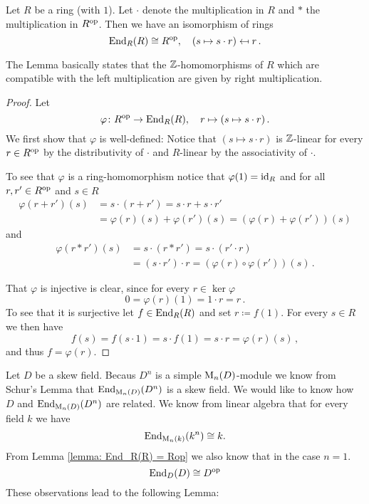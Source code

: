 \begin{lemma}\label{lemma: End_R(R) = Rop}
  Let $R$ be a ring (with $1$).
  Let $\cdot$ denote the multiplication in $R$ and $*$ the multiplication in $R^{\mathrm{op}}$.
  Then we have an isomorphism of rings
  \[
              \operatorname{End}_R(R)
    \cong     R^{\mathrm{op}},
    \quad     (s \mapsto s \cdot r)
    \mapsfrom r \,.
  \]
\end{lemma}


The Lemma basically states that the $\mathbb{Z}$-homomorphisms of $R$ which are compatible with the left multiplication are given by right multiplication.


\begin{proof}
  Let
  \[
            \varphi
    \colon  R^{\mathrm{op}}
    \to     \operatorname{End}_R(R),
    \quad   r
    \mapsto (s \mapsto s \cdot r) \,.
  \]
  We first show that $\varphi$ is well-defined:
  Notice that $(s \mapsto s \cdot r)$ is $\mathbb{Z}$-linear for every $r \in R^{\mathrm{op}}$ by the distributivity of $\cdot$ and $R$-linear by the associativity of $\cdot$.
  
  To see that $\varphi$ is a ring-homomorphism notice that $\varphi(1) = \operatorname{id}_R$ and for all $r, r' \in R^{\mathrm{op}}$ and $s \in R$
  \begin{align*}
        \varphi(r+r')(s)
    &=  s \cdot (r + r')
     =  s \cdot r + s \cdot r' \\
    &=  \varphi(r)(s) + \varphi(r')(s)
     =  (\varphi(r)+\varphi(r'))(s)
  \end{align*}
  and
  \begin{align*}
        \varphi(r * r')(s)
    &=  s \cdot (r * r')
     =  s \cdot (r' \cdot r) \\
    &=  (s \cdot r') \cdot r
     =  \left(\varphi(r) \circ \varphi(r')\right)(s) \,.
  \end{align*}
  
  That $\varphi$ is injective is clear, since for every $r \in \ker \varphi$
  \[
      0
    = \varphi(r)(1)
    = 1 \cdot r
    = r \,.
  \]
  To see that it is surjective let $f \in \operatorname{End}_R(R)$ and set $r \coloneqq f(1)$.
  For every $s \in R$ we then have
  \[
      f(s)
    = f(s \cdot 1)
    = s \cdot f(1)
    = s \cdot r
    = \varphi(r)(s) \,,
  \]
  and thus $f = \varphi(r)$.
\end{proof}


Let $D$ be a skew field.
Becaus $D^n$ is a simple $\operatorname{M}_n(D)$-module we know from Schur’s Lemma that $\operatorname{End}_{\operatorname{M}_n(D)}(D^n)$ is a skew field.
We would like to know how $D$ and $\operatorname{End}_{\operatorname{M}_n(D)}(D^n)$ are related.
We know from linear algebra that for every field $k$ we have
\[
        \operatorname{End}_{\operatorname{M}_n(k)}(k^n)
  \cong k.
\]
From Lemma \ref{lemma: End_R(R) = Rop} we also know that in the case $n = 1$. 
\[
  \operatorname{End}_D(D) \cong D^{\mathrm{op}}
\]
These observations lead to the following Lemma:


